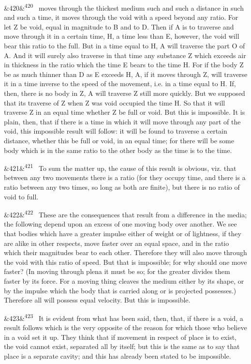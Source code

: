 \documentclass[12pt]{article}
\newcommand{\para}[1][]{\par\noindent\ifx&#1&\else\textsuperscript{\footnotesize #1}~\fi}
\begin{document}
\para[420] moves through the thickest medium such and such a distance in such and such a time, it moves through the void with a speed beyond any ratio. For let Z be void, equal in magnitude to B and to D. Then if A is to traverse and move through it in a certain time, H, a time less than E, however, the void will bear this ratio to the full. But in a time equal to H, A will traverse the part O of A. And it will surely also traverse in that time any substance Z which exceeds air in thickness in the ratio which the time E bears to the time H. For if the body Z be as much thinner than D as E exceeds H, A, if it moves through Z, will traverse it in a time inverse to the speed of the movement, i.e. in a time equal to H. If, then, there is no body in Z, A will traverse Z still more quickly. But we supposed that its traverse of Z when Z was void occupied the time H. So that it will traverse Z in an equal time whether Z be full or void. But this is impossible. It is plain, then, that if there is a time in which it will move through any part of the void, this impossible result will follow: it will be found to traverse a certain distance, whether this be full or void, in an equal time; for there will be some body which is in the same ratio to the other body as the time is to the time.

\para[421] To sum the matter up, the cause of this result is obvious, viz. that between any two movements there is a ratio (for they occupy time, and there is a ratio between any two times, so long as both are finite), but there is no ratio of void to full.

\para[422] These are the consequences that result from a difference in the media; the following depend upon an excess of one moving body over another. We see that bodies which have a greater impulse either of weight or of lightness, if they are alike in other respects, move faster over an equal space, and in the ratio which their magnitudes bear to each other. Therefore they will also move through the void with this ratio of speed. But that is impossible; for why should one move faster? (In moving through plena it must be so; for the greater divides them faster by its force. For a moving thing cleaves the medium either by its shape, or by the impulse which the body that is carried along or is projected possesses.) Therefore all will possess equal velocity. But this is impossible.

\para[423] It is evident from what has been said, then, that, if there is a void, a result follows which is the very opposite of the reason for which those who believe in a void set it up. They think that if movement in respect of place is to exist, the void cannot exist, separated all by itself; but this is the same as to say that place is a separate cavity; and this has already been stated to be impossible.
\end{document}
